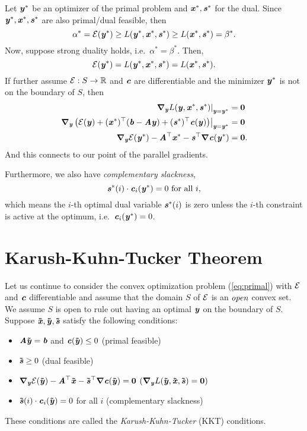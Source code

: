 Let $\yy^*$ be an optimizer of the primal problem and $\xx^*, \ss^*$ for the dual. Since $\yy^*, \xx^*, \ss^*$ are also primal/dual feasible, then
\[ \alpha^* = \calE(\yy^*) \geq L(\yy^*, \xx^*, \ss^*) \geq L(\xx^*, \ss^*) = \beta^*. \]
Now, suppose strong duality holds, i.e.\ $\alpha^* = \beta^*$. Then,
\[ \calE(\yy^*) = L(\yy^*, \xx^*, \ss^*) = L(\xx^*, \ss^*). \]
If further assume $\calE: S \to \R$ and $\cc$ are differentiable and the minimizer $\yy^*$ is not on the boundary of $S$, then
\begin{align*}
  \left.\grad_{\yy}L(\yy, \xx^*, \ss^*)\right|_{\yy=\yy^*} &= \matzero \\
  \left.\grad_{\yy} \left( \calE(\yy) + (\xx^*)^\trp(\bb - \AA\yy) + (\ss^*)^\trp\cc(\yy) \right) \right|_{\yy=\yy^*} &= \matzero \\
  \grad_{\yy}\calE(\yy^*) - \AA^\trp\xx^* - \ss^\trp\grad\cc(\yy^*) &= \matzero.
\end{align*}
And this connects to our point of the parallel gradients.

Furthermore, we also have \emph{complementary slackness},
\[ \ss^*(i)\cdot\cc_i(\yy^*) = 0 \text{ for all } i, \]
which means the $i$-th optimal dual variable $\ss^*(i)$ is zero unless the $i$-th constraint is active at the optimum, i.e.\ $\cc_i(\yy^*)=0$.


\section{Karush-Kuhn-Tucker Theorem}
Let us continue to consider the convex optimization problem
(\ref{eq:primal}) with $\calE$ and $\cc$ differentiable and assume
that the domain $S$ of $\calE$ is an $\emph{open}$ convex set.
We assume $S$ is open to rule out having an optimal $\yy$ on the
boundary of $S$.
Suppose $\xxtil, \yytil, \sstil$ satisfy the following conditions:
\begin{itemize}
  \item $\AA\yytil = \bb$ and $\cc(\yytil) \leq 0$ \hfill (primal feasible)
  \item $\sstil \geq 0$ \hfill (dual feasible)
  \item $\grad_{\yy}\calE(\yytil) - \AA^\trp\xxtil - \sstil^\trp\grad\cc(\yytil) = \matzero$ \hfill $\left(\grad_{\yy}L(\yytil,\xxtil, \sstil)=\matzero\right)$
  \item $\sstil(i)\cdot\cc_i(\yytil) = 0$ for all $i$ \hfill (complementary slackness)
\end{itemize}
These conditions are called the \emph{Karush-Kuhn-Tucker} (KKT) conditions.

